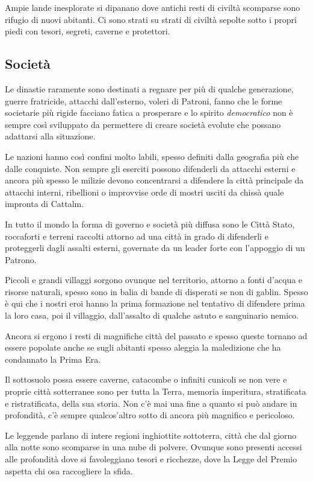 \begin{multicols}{2}
Ampie lande inesplorate si dipanano dove antichi resti di civiltà scomparse sono rifugio di nuovi abitanti. Ci sono strati su strati di civiltà sepolte sotto i propri piedi con tesori, segreti, caverne e protettori.

\subsection{Società}\label{societasullaterra}

Le dinastie raramente sono destinati a regnare per più di qualche generazione, guerre fratricide, attacchi dall'esterno, voleri di Patroni, fanno che le forme societarie più rigide facciano fatica a prosperare e lo spirito \emph{democratico} non è sempre così sviluppato da permettere di creare società evolute che possano adattarsi alla situazione.

Le nazioni hanno così confini molto labili, spesso definiti dalla geografia più che dalle conquiste. Non sempre gli eserciti possono difenderli da attacchi esterni e ancora più spesso le milizie devono concentrarsi a difendere la città principale da attacchi interni, ribellioni o improvvise orde di mostri usciti da chissà quale impronta di Cattalm.

In tutto il mondo la forma di governo e società più diffusa sono le Città Stato, roccaforti e terreni raccolti attorno ad una città in grado di difenderli e proteggerli dagli assalti esterni, governate da un leader forte con l'appoggio di un Patrono.

Piccoli e grandi villaggi sorgono ovunque nel territorio, attorno a fonti d'acqua e risorse naturali, spesso sono in balia di bande di disperati se non di gablin.
Spesso è qui che i nostri eroi hanno la prima formazione nel tentativo di difendere prima la loro casa, poi il villaggio, dall'assalto di qualche astuto e sanguinario nemico.

Ancora si ergono i resti di magnifiche città del passato e spesso queste tornano ad essere popolate anche se sugli abitanti spesso aleggia la maledizione che ha condannato la Prima Era.

Il sottosuolo possa essere caverne, catacombe o infiniti cunicoli se non vere e proprie città sotterranee sono per tutta la Terra, memoria imperitura, stratificata e ristratificata, della sua storia. Non c'è mai una fine a quanto si può andare in profondità, c'è sempre qualcos'altro sotto di ancora più magnifico e pericoloso.

Le leggende parlano di intere regioni inghiottite sottoterra, città che dal giorno alla notte sono scomparse in una nube di polvere. Ovunque sono presenti accessi alle profondità dove si favoleggiano tesori e ricchezze, dove la Legge del Premio aspetta chi osa raccogliere la sfida.


\end{multicols}
